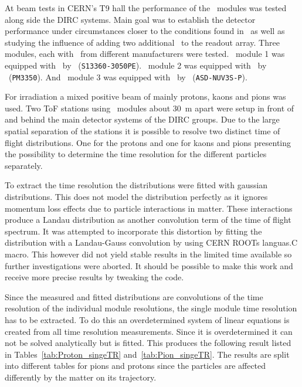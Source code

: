 \documentclass[../BTOF_summary.tex]{subfiles}
\begin{document}
At beam tests in CERN's T9 hall the performance of the \btof\ modules was tested along side the DIRC systems.
Main goal was to establish the detector performance under circumstances closer to the conditions found in \panda\ as well as  studying the influence of adding two additional \sipms\ to the readout array.
Three modules, each with \sipms\ from different manufacturers were tested.
\btof\ module 1 was equipped with \sipms\ by \hamamatsu~(\texttt{S13360-3050PE}).
\btof\ module 2 was equipped with \sipms\ by \ketek~(\texttt{PM3350}).
And \btof\ module 3 was equipped with \sipms\ by \advansid~(\texttt{ASD-NUV3S-P}).

For irradiation a mixed positive beam of mainly protons, kaons and pions was used.
Two ToF stations using \btof\ modules about \SI{30}{m} apart were setup in front of and behind the main detector systems of the DIRC groups.
Due to the large spatial separation of the stations it is possible to resolve two distinct time of flight distributions.
One for the protons and one for kaons and pions presenting the possibility to determine the time resolution for the different particles separately.

To extract the time resolution the distributions were fitted with gaussian distributions.
This does not model the distribution perfectly as it ignores momentum loss effects due to particle interactions in matter.
These interactions produce a Landau distribution as another convolution term of the time of flight spectrum.
It was attempted to incorporate this distortion by fitting the distribution with a Landau-Gauss convolution by using CERN ROOTs languas.C macro.
This however did not yield stable results in the limited time available so further investigations were aborted.
It should be possible to make this work and receive more precise results by tweaking the code.

Since the measured and fitted distributions are convolutions of the time resolution of the individual module resolutions, the single module time resolution has to be extracted.
To do this an overdetermined system of linear equations is created from all time resolution measurements.
Since it is overdetermined it can not be solved analytically but is fitted.
This produces the following result listed in Tables~\ref{tab:Proton_singeTR} and~\ref{tab:Pion_singeTR}.
The results are split into different tables for pions and protons since the particles are affected differently by the matter on its trajectory.
\end{document}
